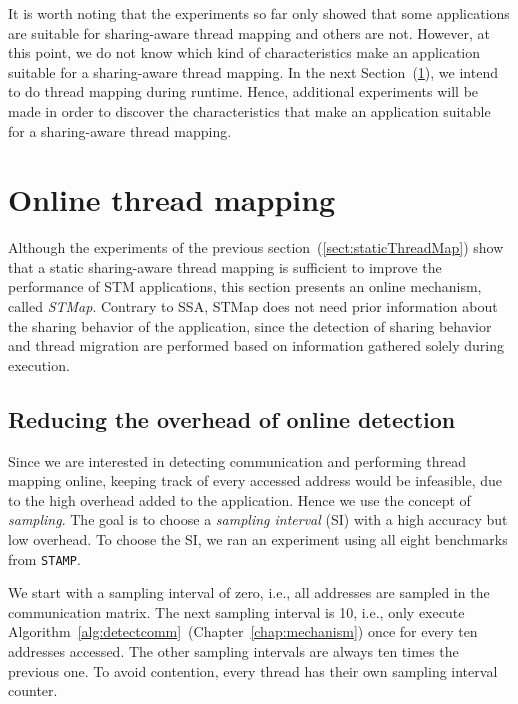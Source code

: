 It is worth noting that the experiments so far only showed that some applications are suitable for sharing-aware thread mapping and others are not. However, at this point, we do not know which kind of characteristics make an application suitable for a sharing-aware thread mapping. In the next Section~(\ref{sect:onlineThreadMapping}), we intend to do thread mapping during runtime. Hence, additional experiments will be made in order to discover the characteristics that make an application suitable for a sharing-aware thread mapping.

\section{Online thread mapping}\label{sect:onlineThreadMapping}

Although the experiments of the previous section~(\ref{sect:staticThreadMap}) show that a static sharing-aware thread mapping is sufficient to improve the performance of STM applications, this section presents an online mechanism, called \emph{STMap}. Contrary to SSA, STMap does not need prior information about the sharing behavior of the application, since the detection of sharing behavior and thread migration are performed based on information gathered solely during execution.

\subsection{Reducing the overhead of online detection}\label{sec:lessoverhead}

Since we are interested in detecting communication and performing thread mapping online, keeping track of every accessed address would be infeasible, due to the high overhead added to the application. Hence we use the concept of \emph{sampling}. The goal is to choose a \emph{sampling interval} (SI) with a high accuracy but low overhead. To choose the SI, we ran an experiment using all eight benchmarks from  \texttt{STAMP}. %

We start with a sampling interval of zero, i.e., all addresses are sampled in the communication matrix. The next sampling interval is 10, i.e., only execute Algorithm~\ref{alg:detectcomm}~(Chapter~\ref{chap:mechanism}) once for every ten addresses accessed. The other sampling intervals are always ten times the previous one. To avoid contention, every thread has their own sampling interval counter.

